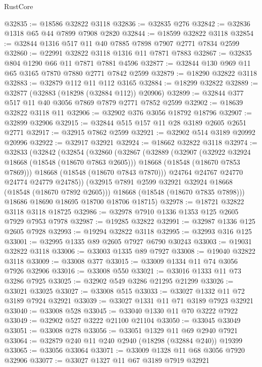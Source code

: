 \begin{lexlean}{RustCore}
\begin{coremodule}
@32835 := @18586 @32822 @3118
@32836 := @32835 @276
@32842 := @32836 @1318 @65 @44 @7899 @7908 @2820
@32844 := @18599 @32822 @3118
@32854 := @32844 @1316 @517 @11 @40 @7885 @7898 @7907 @2771 @7834 @2599
@32860 := @22991 @32822 @3118 @1316 @11 @7871 @7883
@32867 := @32835 @804 @1290 @66 @11 @7871 @7881 @4596
@32877 := @32844 @130 @969 @11 @65 @3165 @7870 @7880 @2771 @7842 @2599
@32879 := @18290 @32822 @3118
@32883 := @32879 @112 @11 @112 @3165
@32884 := @18299 @32822
@32889 := @32877 (@32883 (@18298 (@32884 @112)) @20906)
@32899 := @32844 @377 @517 @11 @40 @3056 @7869 @7879 @2771 @7852 @2599
@32902 := @18639 @32822 @3118 @11
@32906 := @32902 @376 @3056 @18792 @18796
@32907 := @32899 @32906
@32915 := @32844 @515 @157 @11 @28 @3189 @2605 @2651 @2771
@32917 := @32915 @7862 @2599
@32921 := @32902 @514 @3189 @20992 @20996
@32922 := @32917 @32921
@32924 := @18662 @32822 @3118
@32974 := @32833
    (@32842
      (@32854
        (@32860
          (@32867
            (@32889
              (@32907
                (@32922 @32924 @18668 (@18548 (@18670 @7863 @2605)))
                @18668
                (@18548 (@18670 @7853 @7869)))
              @18668
              (@18548 (@18670 @7843 @7870)))
            @24764
            @24767
            @24770
            @24774
            @24779
            @24785))
        (@32915 @7891 @2599 @32921 @32924 @18668 (@18548 (@18670 @7892 @2605)))
        @18668
        (@18548 (@18670 @7835 @7898)))
      @18686
      @18690
      @18695
      @18700
      @18706
      @18715)
@32978 := @18721 @32822 @3118 @3118 @18725
@32986 := @32978 @7910 @1336 @1353 @125 @2605 @7929 @7953 @7978
@32987 := @19285 @32822
@32991 := @32987 @1336 @125 @2605 @7928
@32993 := @19294 @32822 @3118
@32995 := @32993 @316 @125
@33001 := @32995 @1335 @89 @2605 @7927 @6790 @30243
@33003 := @19031 @32822 @3118
@33006 := @33003 @1335 @89 @7927
@33008 := @19040 @32822 @3118
@33009 := @33008 @377
@33015 := @33009 @1334 @11 @74 @3056 @7926 @32906
@33016 := @33008 @550
@33021 := @33016 @1333 @11 @73 @3286 @7925
@33025 := @32902 @549 @3286 @21295 @21299
@33026 := @33021 @33025
@33027 := @33008 @515
@33033 := @33027 @1332 @11 @72 @3189 @7924 @32921
@33039 := @33027 @1331 @11 @71 @3189 @7923 @32921
@33040 := @33008 @528
@33045 := @33040 @1330 @11 @70 @3222 @7922
@33049 := @32902 @527 @3222 @21100 @21104
@33050 := @33045 @33049
@33051 := @33008 @278
@33056 := @33051 @1329 @11 @69 @2940 @7921
@33064 := @32879 @240 @11 @240 @2940 (@18298 (@32884 @240)) @19399
@33065 := @33056 @33064
@33071 := @33009 @1328 @11 @68 @3056 @7920 @32906
@33077 := @33027 @1327 @11 @67 @3189 @7919 @32921

\end{coremodule}
\end{lexlean}
